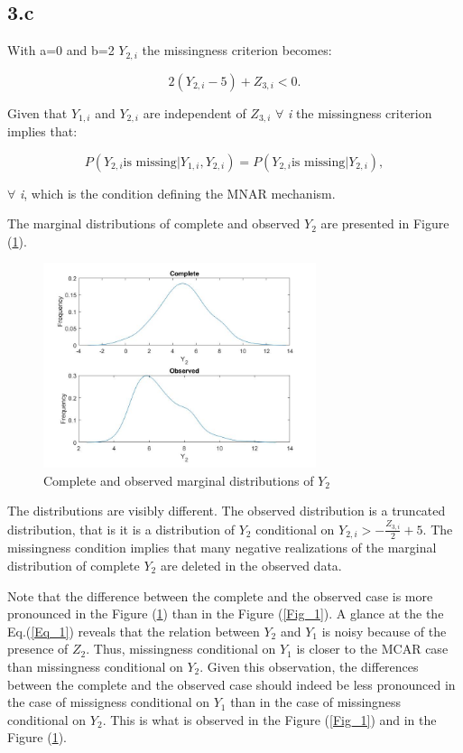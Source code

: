 \documentclass{article}
\begin{document}
\subsection*{3.c}

With a=0 and b=2 $Y_{2,i}$ the missingness criterion becomes:

\[
2\left(Y_{2,i}-5\right)+Z_{3,i}<0.
\]

Given that $Y_{1,i}$ and $Y_{2,i}$ are independent of $Z_{3,i}$ $\forall$ \textit{i} the missingness criterion implies that:

\[
P\left(Y_{2,i} \mbox{is missing}|Y_{1,i},Y_{2,i}\right)=P\left(Y_{2,i} \mbox{is missing}|Y_{2,i}\right),
\]

$\forall$ \textit{i}, which is the condition defining the MNAR mechanism.

The marginal distributions of complete and observed $Y_{2}$ are presented in Figure (\ref{Fig_3}).

\begin{figure}[H]
\centering
\caption{Complete and observed marginal distributions of $Y_{2}$}
\label{Fig_3}
\includegraphics[width=8cm]{q3c.jpg}
\end{figure} 

The distributions are visibly different. The observed distribution is a truncated distribution, that is it is a distribution of $Y_{2}$  conditional on  $Y_{2,i}>-\frac{Z_{3,i}}{2}+5$. The missingness condition implies that many negative realizations of the marginal distribution of complete $Y_{2}$ are deleted in the observed data. 

Note that the difference between the complete and the observed case is more pronounced in the Figure (\ref{Fig_3}) than in the Figure (\ref{Fig_1}). A glance at the the Eq.(\ref{Eq_1}) reveals that the relation between $Y_{2}$ and $Y_{1}$ is noisy because of the presence of $Z_{2}$. Thus, missingness conditional on $Y_{1}$ is closer to the MCAR case than missingness conditional on $Y_{2}$. Given this observation, the differences between the complete and the observed case should indeed be less pronounced in the case of missigness conditional on $Y_{1}$ than in the case of missingness conditional on $Y_{2}$. This is what is observed in the Figure (\ref{Fig_1}) and in the Figure (\ref{Fig_3}).    
\end{document}
